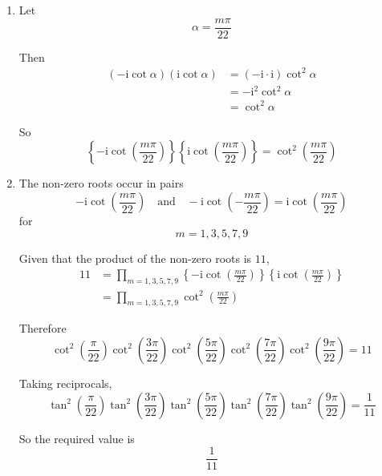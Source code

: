 \documentclass[leqno]{article}
\begin{document}
\begin{enumerate}[
  label=\textbf{\arabic*.},
  leftmargin=*,
  topsep=0pt,
  partopsep=0pt,
  parsep=0pt
]
\begin{tcolorbox}[colback=white, colframe=scarlet, title={\textbf{Solution}}, breakable, grow to left by=6mm, grow to right by=10mm]
\begin{enumerate}[label=\textbf{(\roman*)}]
Therefore the 10 non-real roots may be written as
\[
-\mathrm{i}\cot\left(\frac{m\pi}{22}\right),
\qquad m=\pm1,\pm3,\pm5,\pm7,\pm9
\]

\item Let
\[
\alpha=\frac{m\pi}{22}
\]

Then
\begin{align*}
\left(-\mathrm{i}\cot\alpha\right)\left(\mathrm{i}\cot\alpha\right)
&=(-\mathrm{i}\cdot \mathrm{i})\cot^2\alpha \\
&=-\mathrm{i}^2\cot^2\alpha \\
&=\cot^2\alpha
\end{align*}

So
\[
\left\{-\mathrm{i}\cot\left(\frac{m\pi}{22}\right)\right\}\left\{\mathrm{i}\cot\left(\frac{m\pi}{22}\right)\right\}
=\cot^2\left(\frac{m\pi}{22}\right)
\]

\item The non-zero roots occur in pairs
\[
-\mathrm{i}\cot\left(\frac{m\pi}{22}\right)
\quad \text{and} \quad
-\mathrm{i}\cot\left(-\frac{m\pi}{22}\right)
=\mathrm{i}\cot\left(\frac{m\pi}{22}\right)
\]
for
\[
m=1,3,5,7,9
\]

Given that the product of the non-zero roots is $11$,
\begin{align*}
11
&=\prod_{m=1,3,5,7,9}
\left\{-\mathrm{i}\cot\left(\frac{m\pi}{22}\right)\right\}
\left\{\mathrm{i}\cot\left(\frac{m\pi}{22}\right)\right\} \\
&=\prod_{m=1,3,5,7,9}
\cot^2\left(\frac{m\pi}{22}\right)
\end{align*}

Therefore
\[
\cot^2\left(\frac{\pi}{22}\right)
\cot^2\left(\frac{3\pi}{22}\right)
\cot^2\left(\frac{5\pi}{22}\right)
\cot^2\left(\frac{7\pi}{22}\right)
\cot^2\left(\frac{9\pi}{22}\right)
=11
\]

Taking reciprocals,
\[
\tan^2\left(\frac{\pi}{22}\right)
\tan^2\left(\frac{3\pi}{22}\right)
\tan^2\left(\frac{5\pi}{22}\right)
\tan^2\left(\frac{7\pi}{22}\right)
\tan^2\left(\frac{9\pi}{22}\right)
=\frac{1}{11}
\]

So the required value is
\[
\frac{1}{11}
\]
\end{enumerate}
\end{tcolorbox}


\end{enumerate}
\end{document}
